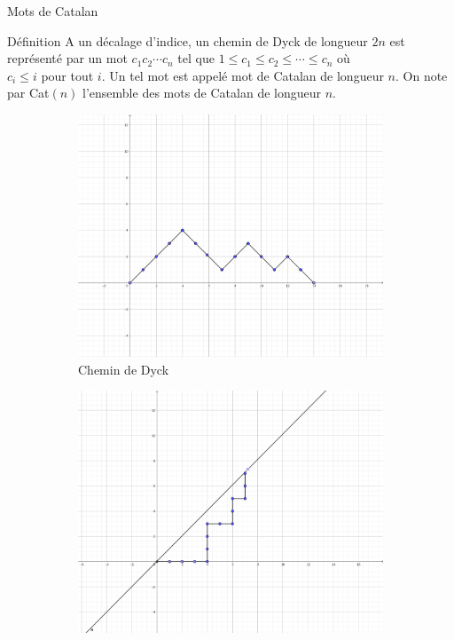 \begin{frame}{Mots de Catalan}
    \begin{block}{Définition}
        A un décalage d'indice, un chemin de Dyck de longueur $2n$ est représenté par un mot $c_{1}c_{2}
        \cdots c_{n}$ tel que $1 \leq c_{1} \leq c_{2} \leq \cdots \leq c_{n}$ où \\ $c_{i} \leq i$ pour
        tout $i$. Un tel mot est appelé mot de Catalan de longueur $n$. On note par Cat$(n)$ l'ensemble des mots de Catalan  de longueur $n$.
    \end{block}
    \begin{figure}[h!]
        \centering
        \begin{subfigure}[b]{0.38\textwidth}
            \centering
            \includegraphics[width=\textwidth]{./images/dyck path.png}
            \caption{Chemin de Dyck}
        \end{subfigure}
        \hspace{1cm}
        \begin{subfigure}[b]{0.38\textwidth}
            \centering
            \includegraphics[width=\textwidth]{./images/transformed-dyck path.png}

\end{subfigure}
\end{figure}
\end{frame}

